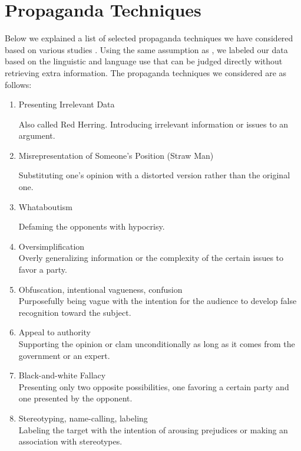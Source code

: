 \documentclass[sigconf]{acmart}
\begin{document}
\section{Propaganda Techniques}

Below we explained a list of selected propaganda techniques we have considered based on various studies \cite{da2019fine} \cite{baisa2019benchmark} \cite{enwiki:1020793767}. Using the same assumption as \cite{da2019fine}, we labeled our data based on the linguistic and language use that can be judged directly without retrieving extra information. The propaganda techniques we considered are as follows: 

\begin{enumerate}

  \item Presenting Irrelevant Data
  
  Also called Red Herring. Introducing irrelevant information or issues to an argument. 
  
  \item Misrepresentation of Someone's Position (Straw Man)
  
  Substituting one's opinion with a distorted version rather than the original one.    
  
  \item Whataboutism
  
  Defaming the opponents with hypocrisy.
  
  \item Oversimplification \\
  Overly generalizing information or the complexity of the certain issues to favor a party. 
  
  \item Obfuscation, intentional vagueness, confusion\\
  Purposefully being vague with the intention for the audience to develop false recognition toward the subject. 
  
  \item Appeal to authority\\
  Supporting the opinion or clam unconditionally as long as it comes from the government or an expert.
  
  \item Black-and-white Fallacy\\
  Presenting only two opposite possibilities, one favoring a certain party and one presented by the opponent. 
  
  \item Stereotyping, name-calling, labeling\\
  Labeling the target with the intention of arousing prejudices or making an association with stereotypes. 
  

\end{enumerate}
\end{document}
